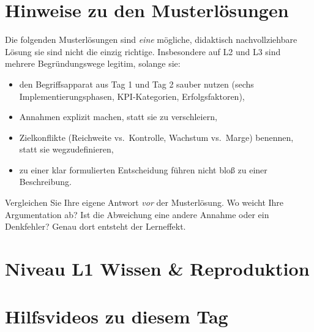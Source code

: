 \documentclass[11pt,a4paper,oneside]{article}
\begin{document}
\section*{Hinweise zu den Musterlösungen}
\thispagestyle{plain}

\noindent Die folgenden Musterlösungen sind \emph{eine} mögliche, didaktisch nachvollziehbare Lösung \textendash{} sie sind nicht die einzig richtige. Insbesondere auf L2 und L3 sind mehrere Begründungswege legitim, solange sie:

\begin{itemize}
  \item den Begriffsapparat aus Tag 1 und Tag 2 sauber nutzen (sechs Implementierungsphasen, KPI-Kategorien, Erfolgsfaktoren),
  \item Annahmen explizit machen, statt sie zu verschleiern,
  \item Zielkonflikte (Reichweite vs.\ Kontrolle, Wachstum vs.\ Marge) benennen, statt sie wegzudefinieren,
  \item zu einer klar formulierten Entscheidung führen \textendash{} nicht bloß zu einer Beschreibung.
\end{itemize}

\begin{infobox}
Vergleichen Sie Ihre eigene Antwort \emph{vor} der Musterlösung. Wo weicht Ihre Argumentation ab? Ist die Abweichung eine andere Annahme \textendash{} oder ein Denkfehler? Genau dort entsteht der Lerneffekt.
\end{infobox}

\clearpage

\section*{Niveau L1 \textendash{} Wissen \& Reproduktion}

\section*{Hilfsvideos zu diesem Tag}
\thispagestyle{plain}
\end{document}
